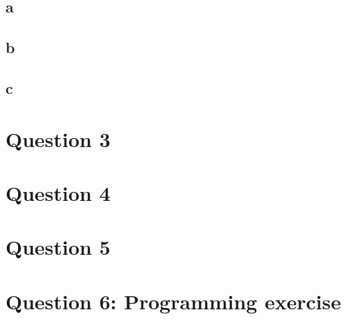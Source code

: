 \documentclass[12pt]{article}
\begin{document}
\subsection*{a} %

\subsection*{b} %

\subsection*{c} %
\section*{Question 3}

\section*{Question 4}

\section*{Question 5}

\section*{Question 6: Programming exercise}
\end{document}
